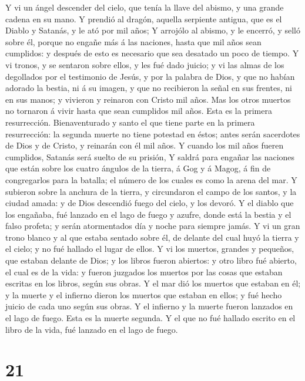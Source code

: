  Y vi un ángel descender del cielo, que tenía la llave del
abismo, y una grande cadena en su mano.  Y prendió al
dragón, aquella serpiente antigua, que es el Diablo y Satanás, y le ató
por mil años;  Y arrojólo al abismo, y le encerró, y selló
sobre él, porque no engañe más á las naciones, hasta que mil años sean
cumplidos: y después de esto es necesario que sea desatado un poco de
tiempo.  Y vi tronos, y se sentaron sobre ellos, y les fué
dado juicio; y vi las almas de los degollados por el testimonio de
Jesús, y por la palabra de Dios, y que no habían adorado la bestia, ni á
su imagen, y que no recibieron la señal en sus frentes, ni en sus manos;
y vivieron y reinaron con Cristo mil años.  Mas los otros
muertos no tornaron á vivir hasta que sean cumplidos mil años. Esta es
la primera resurrección.  Bienaventurado y santo el que
tiene parte en la primera resurrección: la segunda muerte no tiene
potestad en éstos; antes serán sacerdotes de Dios y de Cristo, y
reinarán con él mil años.  Y cuando los mil años fueren
cumplidos, Satanás será suelto de su prisión,  Y saldrá para
engañar las naciones que están sobre los cuatro ángulos de la tierra, á
Gog y á Magog, á fin de congregarlos para la batalla; el número de los
cuales es como la arena del mar.  Y subieron sobre la
anchura de la tierra, y circundaron el campo de los santos, y la ciudad
amada: y de Dios descendió fuego del cielo, y los devoró. 
Y el diablo que los engañaba, fué lanzado en el lago de fuego y azufre,
donde está la bestia y el falso profeta; y serán atormentados día y
noche para siempre jamás.  Y vi un gran trono blanco y al
que estaba sentado sobre él, de delante del cual huyó la tierra y el
cielo; y no fué hallado el lugar de ellos.  Y vi los
muertos, grandes y pequeños, que estaban delante de Dios; y los libros
fueron abiertos: y otro libro fué abierto, el cual es de la vida: y
fueron juzgados los muertos por las cosas que estaban escritas en los
libros, según sus obras.  Y el mar dió los muertos que
estaban en él; y la muerte y el infierno dieron los muertos que estaban
en ellos; y fué hecho juicio de cada uno según sus obras. 
Y el infierno y la muerte fueron lanzados en el lago de fuego. Esta es
la muerte segunda.  Y el que no fué hallado escrito en el
libro de la vida, fué lanzado en el lago de fuego.

\hypertarget{section-20}{%
\section{21}\label{section-20}}

